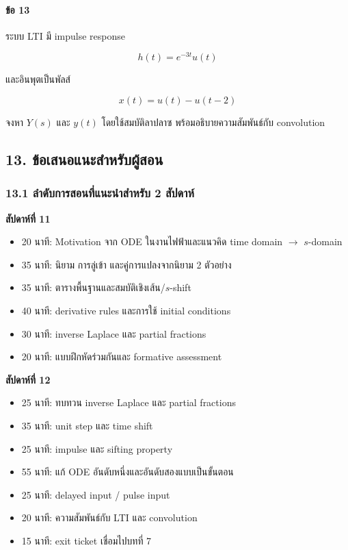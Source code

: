 \paragraph{ข้อ 13}

ระบบ LTI มี impulse response

\[
h(t)=e^{-3t}u(t)
\]

และอินพุตเป็นพัลส์

\[
x(t)=u(t)-u(t-2)
\]

จงหา $Y(s)$ และ $y(t)$ โดยใช้สมบัติลาปลาซ พร้อมอธิบายความสัมพันธ์กับ convolution

\newpage

\subsection{13. ข้อเสนอแนะสำหรับผู้สอน}

\subsubsection{13.1 ลำดับการสอนที่แนะนำสำหรับ 2 สัปดาห์}

\textbf{สัปดาห์ที่ 11}

\begin{itemize}
    \item 20 นาที: Motivation จาก ODE ในงานไฟฟ้าและแนวคิด time domain $\to$ $s$-domain
    \item 35 นาที: นิยาม การลู่เข้า และคู่การแปลงจากนิยาม 2 ตัวอย่าง
    \item 35 นาที: ตารางพื้นฐานและสมบัติเชิงเส้น/$s$-shift
    \item 40 นาที: derivative rules และการใช้ initial conditions
    \item 30 นาที: inverse Laplace และ partial fractions
    \item 20 นาที: แบบฝึกหัดร่วมกันและ formative assessment
\end{itemize}

\textbf{สัปดาห์ที่ 12}

\begin{itemize}
    \item 25 นาที: ทบทวน inverse Laplace และ partial fractions
    \item 35 นาที: unit step และ time shift
    \item 25 นาที: impulse และ sifting property
    \item 55 นาที: แก้ ODE อันดับหนึ่งและอันดับสองแบบเป็นขั้นตอน
    \item 25 นาที: delayed input / pulse input
    \item 20 นาที: ความสัมพันธ์กับ LTI และ convolution
    \item 15 นาที: exit ticket เชื่อมไปบทที่ 7
\end{itemize}

